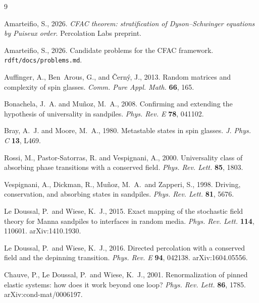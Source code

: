 \documentclass[10pt,a4paper,twocolumn]{article}
\theoremstyle{plain}
\theoremstyle{definition}
\begin{document}
\begin{thebibliography}{9}

  Amarteifio, S., 2026.
  \textit{CFAC theorem: stratification of Dyson--Schwinger equations
  by Puiseux order}.
  Percolation Labs preprint.

  Amarteifio, S., 2026.
  Candidate problems for the CFAC framework.
  \texttt{rdft/docs/problems.md}.

  Auffinger, A., Ben~Arous, G., and \v{C}ern\'y, J., 2013.
  Random matrices and complexity of spin glasses.
  \textit{Comm. Pure Appl. Math.} \textbf{66}, 165.

  Bonachela, J.~A. and Mu\~noz, M.~A., 2008.
  Confirming and extending the hypothesis of universality in
  sandpiles.
  \textit{Phys. Rev. E} \textbf{78}, 041102.

  Bray, A.~J. and Moore, M.~A., 1980.
  Metastable states in spin glasses.
  \textit{J. Phys. C} \textbf{13}, L469.

  Rossi, M., Pastor-Satorras, R. and Vespignani, A., 2000.
  Universality class of absorbing phase transitions with a
  conserved field.
  \textit{Phys. Rev. Lett.} \textbf{85}, 1803.

  Vespignani, A., Dickman, R., Mu\~noz, M.~A.\ and Zapperi, S., 1998.
  Driving, conservation, and absorbing states in sandpiles.
  \textit{Phys. Rev. Lett.} \textbf{81}, 5676.

  Le Doussal, P.\ and Wiese, K.~J., 2015.
  Exact mapping of the stochastic field theory for Manna sandpiles
  to interfaces in random media.
  \textit{Phys. Rev. Lett.} \textbf{114}, 110601.
  arXiv:1410.1930.

  Le Doussal, P.\ and Wiese, K.~J., 2016.
  Directed percolation with a conserved field and the depinning
  transition.
  \textit{Phys. Rev. E} \textbf{94}, 042138.
  arXiv:1604.05556.

  Chauve, P., Le Doussal, P.\ and Wiese, K.~J., 2001.
  Renormalization of pinned elastic systems: how does it work
  beyond one loop?
  \textit{Phys. Rev. Lett.} \textbf{86}, 1785.
  arXiv:cond-mat/0006197.


\end{thebibliography}
\end{document}
